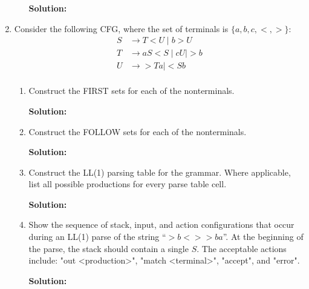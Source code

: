 \documentclass[11pt]{article}
\begin{document}
\begin{enumerate}
\begin{enumerate}
    \textbf{Solution:}

  \end{enumerate}

  \newpage
  
\item Consider the following CFG, where the set of terminals is $\{a, b, c, <, > \}$:
  \begin{equation*}
    \begin{split}
      S &\to T<U \mid b>U \\
      T &\to aS<S \mid cU | >b \\
      U &\to >Ta \mid <Sb \\
    \end{split}
  \end{equation*}

  \begin{enumerate}
  \item Construct the FIRST sets for each of the nonterminals.

  \textbf{Solution:}
    
  \item Construct the FOLLOW sets for each of the nonterminals.

  \textbf{Solution:}

  \item Construct the LL(1) parsing table for the grammar. Where applicable, list all possible productions for every parse table cell.  

  \textbf{Solution:}
    
  \item Show the sequence of stack, input, and action configurations that occur during an LL(1) parse of the string ``$> b < > > b a$''. At the beginning of the parse, the stack should contain a single $S$. The acceptable actions include: "out <production>", "match <terminal>", "accept", and "error". 

  \textbf{Solution:}

  \end{enumerate}

  \newpage


\end{enumerate}
\end{document}
